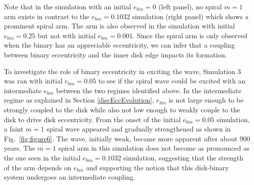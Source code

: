 Note that in the simulation with an initial $e_{bin} = 0$ (left panel), no spiral $m = 1$ 
arm exists in contrast to the $e_{bin} = 0.1032$ simulation (right panel) which
shows a prominent spiral arm.  The arm is also observed in the
simulation with initial $e_{bin} = 0.25$ but not with initial $e_{bin}
= 0.001$.  Since the spiral arm is only observed when the binary has
an appreciable eccentricity, we can infer that a coupling between binary eccentricity
and the inner disk edge impacts its formation.  

To investigate the role of binary eccentricity in exciting the wave, Simulation 3 was ran with initial $e_{bin} = 0.05$ to see if the spiral wave could be excited with an intermediate $e_{bin}$ between the two regimes identified above.  In the intermediate regime as explained in Section \ref{discEccEvolution}, $e_{bin}$ is not large enough to be strongly coupled to the disk while also not low enough to weakly couple to the disk to drive disk eccentricity.  From the onset of the initial $e_{bin} = 0.05$ simulation, a faint $m = 1$ spiral wave appeared and gradually strengthened as shown in Fig.~\ref{fig:figure6}.  The wave, initially weak, became more apparent after about 900 years.  The $m = 1$ spiral arm in this simulation does not become as pronounced as the one seen in the initial $e_{bin} = 0.1032$ simulation, suggesting that the strength of the arm depends on $e_{bin}$ and supporting the notion that this disk-binary system undergoes an intermediate coupling.  

